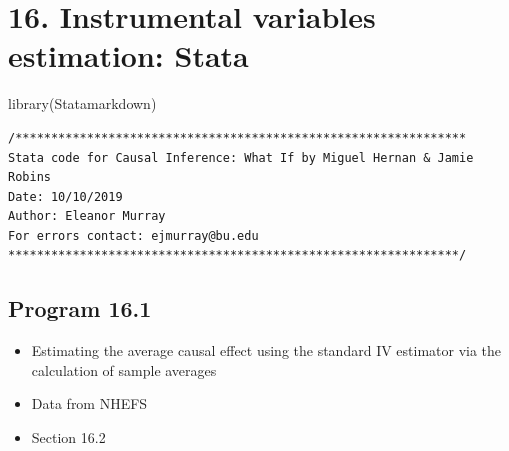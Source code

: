 \documentclass[
  10pt,
  a4paper,
]{book}
\newenvironment{Shaded}{\begin{snugshade}}{\end{snugshade}}
\newcommand{\FunctionTok}[1]{\textcolor[rgb]{0.28,0.35,0.67}{#1}}
\newcommand{\NormalTok}[1]{\textcolor[rgb]{0.00,0.46,0.62}{#1}}
\providecommand{\tightlist}{%
  \setlength{\itemsep}{0pt}\setlength{\parskip}{0pt}}
\begin{document}
\chapter*{16. Instrumental variables estimation: Stata}\label{instrumental-variables-estimation-stata}

\begin{Shaded}
\begin{Highlighting}[]
\FunctionTok{library}\NormalTok{(Statamarkdown)}
\end{Highlighting}
\end{Shaded}

\begin{verbatim}
/***************************************************************
Stata code for Causal Inference: What If by Miguel Hernan & Jamie Robins
Date: 10/10/2019
Author: Eleanor Murray 
For errors contact: ejmurray@bu.edu
***************************************************************/
\end{verbatim}

\section{Program 16.1}\label{program-16.1-1}

\begin{itemize}
\tightlist
\item
  Estimating the average causal effect using the standard IV estimator via the calculation of sample averages
\item
  Data from NHEFS
\item
  Section 16.2
\end{itemize}
\end{document}
